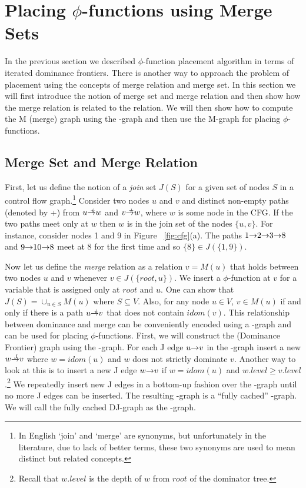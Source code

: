 {\section{Placing $\phi$-functions using Merge Sets}

In the previous section we described $\phi$-function placement algorithm in terms of iterated dominance frontiers. There is another way to approach the problem
of \phifun placement using the concepts of merge relation and merge set. In this section
we will first introduce the notion of merge set and merge relation and then show
how the merge relation is related to the \DF relation. We will then show how to compute
the M (merge) graph using the \DJ-graph and then use the M-graph for placing $\phi$-functions.

\subsection{Merge Set and Merge Relation}

First, let us define the notion of a {\em join} set $J(S)$
 for a given set of nodes  $S$ in a control flow
graph.\footnote{In English `join' and `merge' are synonyms, 
but unfortunately
in the literature, due to lack of  better terms, these two synonyms are used to mean
distinct but related concepts.} Consider two nodes $u$ and $v$ and distinct non-empty
paths (denoted by +) from $u \st{+} w$ and $v \st{+} w$, where $w$ is some node in the CFG. If the 
two paths meet only at $w$ then $w$ is in the join set of the nodes $\{u, v\}$. 
For instance, consider nodes 1 and 9 in Figure ~\ref{fig:cfg}(a).
The paths $1 \st{} 2 \st{} 3 \st{} 8$ and $9 \st{} 10 \st{} 8$ meet at $8$ 
for the first time and so $\{8\} \in J(\{1,9\})$. 

Now let us define the {\em merge} relation as a relation 
$v=M(u)$ that holds between two nodes $u$ and $v$ whenever
$v \in J(\{root, u\})$. We insert a $\phi$-function at $v$ for a variable that is assigned
only at $root$ and $u$. One can show that $J(S) = \cup_{u \in S} M(u)$ where $S \subseteq V$. Also, for any node $u \in V$, $v \in M(u)$ if and only if
there is a path $u \st{+} v$ that does not contain $idom(v)$.  This relationship between
dominance and merge can be conveniently encoded using a \DJ-graph and can be used for placing 
$\phi$-functions. First, we will construct the \DF (Dominance Frontier) graph using the \DJ-graph. For each J edge $u \st{} v$ in the \DJ-graph insert a new  $w \st{J} v$ where
$w = idom (u)$ and $w$ does not strictly dominate $v$. Another way to look at this is to insert a new J edge $w \st{} v$ if $w = idom(u)$ and $w.level \geq v.level$.\footnote{Recall that $w.level$ is the depth of $w$ from
$root$ of the dominator tree.} We repeatedly insert new J edges in a bottom-up fashion over the \DJ-graph until no more J edges can be inserted. The resulting \DJ-graph is a ``fully cached'' \DJ-graph. We will call the fully cached DJ-graph as the \DF-graph.

}

